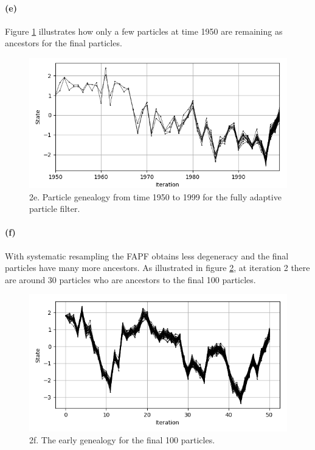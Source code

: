 \documentclass{article}
\begin{document}
\paragraph{(e)} Figure \ref{fig:2_e} illustrates how only a few particles at time 1950 are remaining as ancestors for the final particles. 

\begin{figure}[h]
	\centering
	\includegraphics[width=\linewidth]{2_e}
	\caption{2e. Particle genealogy from time 1950 to 1999 for the fully adaptive particle filter.}
	\label{fig:2_e}
\end{figure}

\paragraph{(f)} With systematic resampling the FAPF obtains less degeneracy and the final particles have many more ancestors. As illustrated in figure \ref{fig:2_f}, at iteration 2 there are around 30 particles who are ancestors to the final 100 particles.
\begin{figure}[h]
	\centering
	\includegraphics[width=\linewidth]{2_f}
	\caption{2f. The early genealogy for the final 100 particles.}
	\label{fig:2_f}
\end{figure}
\end{document}
